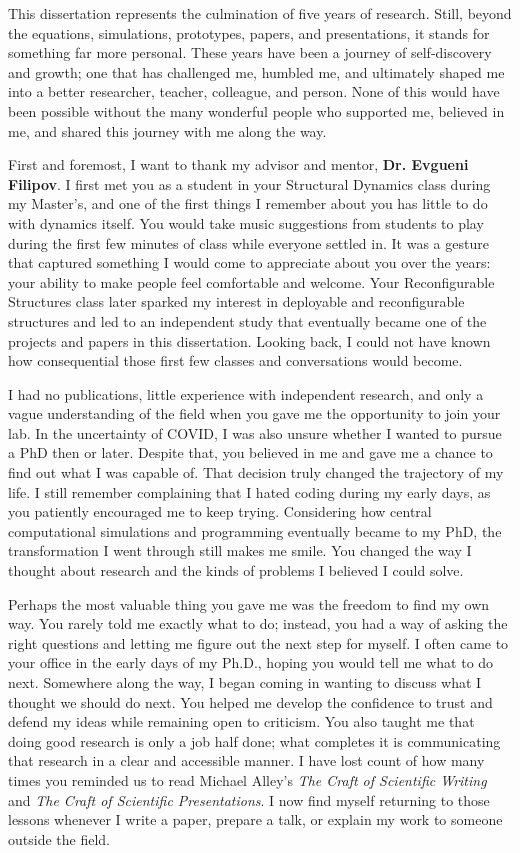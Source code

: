 This dissertation represents the culmination of five years of research. Still, beyond the equations, simulations, prototypes, papers, and presentations, it stands for something far more personal. These years have been a journey of self-discovery and growth; one that has challenged me, humbled me, and ultimately shaped me into a better researcher, teacher, colleague, and person. None of this would have been possible without the many wonderful people who supported me, believed in me, and shared this journey with me along the way.

First and foremost, I want to thank my advisor and mentor, \textbf{Dr. Evgueni Filipov}. I first met you as a student in your Structural Dynamics class during my Master's, and one of the first things I remember about you has little to do with dynamics itself. You would take music suggestions from students to play during the first few minutes of class while everyone settled in. It was a gesture that captured something I would come to appreciate about you over the years: your ability to make people feel comfortable and welcome. Your Reconfigurable Structures class later sparked my interest in deployable and reconfigurable structures and led to an independent study that eventually became one of the projects and papers in this dissertation. Looking back, I could not have known how consequential those first few classes and conversations would become.

I had no publications, little experience with independent research, and only a vague understanding of the field when you gave me the opportunity to join your lab. In the uncertainty of COVID, I was also unsure whether I wanted to pursue a PhD then or later. Despite that, you believed in me and gave me a chance to find out what I was capable of. That decision truly changed the trajectory of my life. I still remember complaining that I hated coding during my early days, as you patiently encouraged me to keep trying. Considering how central computational simulations and programming eventually became to my PhD, the transformation I went through still makes me smile. You changed the way I thought about research and the kinds of problems I believed I could solve.

Perhaps the most valuable thing you gave me was the freedom to find my own way. You rarely told me exactly what to do; instead, you had a way of asking the right questions and letting me figure out the next step for myself. I often came to your office in the early days of my Ph.D., hoping you would tell me what to do next. Somewhere along the way, I began coming in wanting to discuss what I thought we should do next. You helped me develop the confidence to trust and defend my ideas while remaining open to criticism. You also taught me that doing good research is only a job half done; what completes it is communicating that research in a clear and accessible manner. I have lost count of how many times you reminded us to read Michael Alley's \textit{The Craft of Scientific Writing} and \textit{The Craft of Scientific Presentations}. I now find myself returning to those lessons whenever I write a paper, prepare a talk, or explain my work to someone outside the field.

